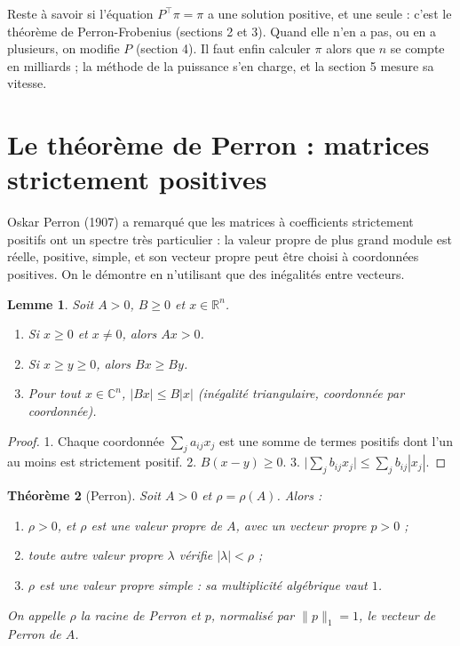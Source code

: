 \documentclass[11pt,a4paper]{article}
\theoremstyle{plain}
\newtheorem{theoreme}{Théorème}[section]
\newtheorem{lemme}[theoreme]{Lemme}
\theoremstyle{definition}
\theoremstyle{remark}
\newcommand{\R}{\mathbb{R}}
\newcommand{\C}{\mathbb{C}}
\begin{document}
Reste à savoir si l'équation $P^\top\pi=\pi$ a une solution positive, et une seule : c'est le théorème de Perron-Frobenius (sections 2 et 3). Quand elle n'en a pas, ou en a plusieurs, on modifie $P$ (section 4). Il faut enfin calculer $\pi$ alors que $n$ se compte en milliards ; la méthode de la puissance s'en charge, et la section 5 mesure sa vitesse.

\section{Le théorème de Perron : matrices strictement positives}

Oskar Perron (1907) a remarqué que les matrices à coefficients strictement positifs ont un spectre très particulier : la valeur propre de plus grand module est réelle, positive, simple, et son vecteur propre peut être choisi à coordonnées positives. On le démontre en n'utilisant que des inégalités entre vecteurs.

\begin{lemme}\label{lem:positif}
Soit $A>0$, $B\geq0$ et $x\in\R^n$.
\begin{enumerate}[nosep]
\item Si $x\geq0$ et $x\neq0$, alors $Ax>0$.
\item Si $x\geq y\geq0$, alors $Bx\geq By$.
\item Pour tout $x\in\C^n$, $|Bx|\leq B|x|$ (inégalité triangulaire, coordonnée par coordonnée).
\end{enumerate}
\end{lemme}

\begin{proof}
1. Chaque coordonnée $\sum_ja_{ij}x_j$ est une somme de termes positifs dont l'un au moins est strictement positif. 2. $B(x-y)\geq0$. 3. $\big|\sum_jb_{ij}x_j\big|\leq\sum_jb_{ij}|x_j|$.
\end{proof}

\begin{theoreme}[Perron]\label{thm:perron}
Soit $A>0$ et $\rho=\rho(A)$. Alors :
\begin{enumerate}[nosep]
\item $\rho>0$, et $\rho$ est une valeur propre de $A$, avec un vecteur propre $p>0$ ;
\item toute autre valeur propre $\lambda$ vérifie $|\lambda|<\rho$ ;
\item $\rho$ est une valeur propre simple : sa multiplicité algébrique vaut $1$.
\end{enumerate}
On appelle $\rho$ la \emph{racine de Perron} et $p$, normalisé par $\|p\|_1=1$, le \emph{vecteur de Perron} de $A$.
\end{theoreme}
\end{document}
